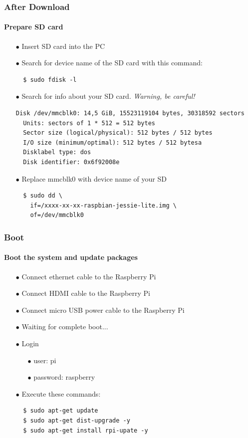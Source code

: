 \documentclass{beamer}
\begin{document}

\begin{frame}[fragile]
\frametitle{\textbf{After Download}}
\framesubtitle{\textbf{Prepare SD card}}
\begin{itemize}
\item[$\bullet$] Insert SD card into the PC
\item[$\bullet$] Search for device name of the SD card with this command:
\begin{lstlisting}
  $ sudo fdisk -l
\end{lstlisting}
\item[$\bullet$] Search for info about your SD card. \textit{Warning, be careful!}
\begin{lstlisting}[basicstyle=\tiny\ttfamily]
  Disk /dev/mmcblk0: 14,5 GiB, 15523119104 bytes, 30318592 sectors      
  Units: sectors of 1 * 512 = 512 bytes                                 
  Sector size (logical/physical): 512 bytes / 512 bytes                 
  I/O size (minimum/optimal): 512 bytes / 512 bytesa                    
  Disklabel type: dos                                                   
  Disk identifier: 0x6f92008e                                           
\end{lstlisting}
\item[$\bullet$] Replace mmcblk0 with device name of your SD
\begin{lstlisting}
  $ sudo dd \
    if=/xxxx-xx-xx-raspbian-jessie-lite.img \
    of=/dev/mmcblk0
\end{lstlisting}
\end{itemize}

\end{frame}


\begin{frame}[fragile]
	\frametitle{\textbf{Boot}}
	\framesubtitle{\textbf{Boot the system and update packages}}

		\begin{itemize}
			\item[$\bullet$] Connect ethernet cable to the Raspberry Pi
			\item[$\bullet$] Connect HDMI cable to the Raspberry Pi
			\item[$\bullet$] Connect micro USB power cable to the Raspberry Pi
			\item[$\bullet$] Waiting for complete boot...
			\item[$\bullet$] Login
			\begin{itemize}
				\item[$\bullet$] user: pi
				\item[$\bullet$] password: raspberry
			\end{itemize}
			\item[$\bullet$] Execute these commands:
			\begin{lstlisting}
  $ sudo apt-get update
  $ sudo apt-get dist-upgrade -y
  $ sudo apt-get install rpi-upate -y
			\end{lstlisting}
		\end{itemize}
\end{frame}
\end{document}
